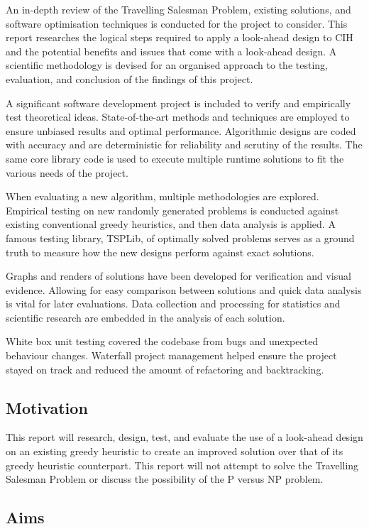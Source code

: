 An in-depth review of the Travelling Salesman Problem, existing solutions, and software optimisation techniques is conducted for the project to consider. This report researches the logical steps required to apply a look-ahead design to CIH and the potential benefits and issues that come with a look-ahead design. A scientific methodology is devised for an organised approach to the testing, evaluation, and conclusion of the findings of this project.

A significant software development project is included to verify and empirically test theoretical ideas. State-of-the-art methods and techniques are employed to ensure unbiased results and optimal performance. Algorithmic designs are coded with accuracy and are deterministic for reliability and scrutiny of the results. The same core library code is used to execute multiple runtime solutions to fit the various needs of the project. 

When evaluating a new algorithm, multiple methodologies are explored. Empirical testing on new randomly generated problems is conducted against existing conventional greedy heuristics, and then data analysis is applied. A famous testing library, TSPLib\cite{TSPLib}, of optimally solved problems serves as a ground truth to measure how the new designs perform against exact solutions.

Graphs and renders of solutions have been developed for verification and visual evidence. Allowing for easy comparison between solutions and quick data analysis is vital for later evaluations. Data collection and processing for statistics and scientific research are embedded in the analysis of each solution.

White box unit testing covered the codebase from bugs and unexpected behaviour changes. Waterfall project management helped ensure the project stayed on track and reduced the amount of refactoring and backtracking.

\subsection{Motivation}

This report will research, design, test, and evaluate the use of a look-ahead design on an existing greedy heuristic to create an improved solution over that of its greedy heuristic counterpart. This report will not attempt to solve the Travelling Salesman Problem or discuss the possibility of the P versus NP problem.

\subsection{Aims}
\label{sec:aims}

